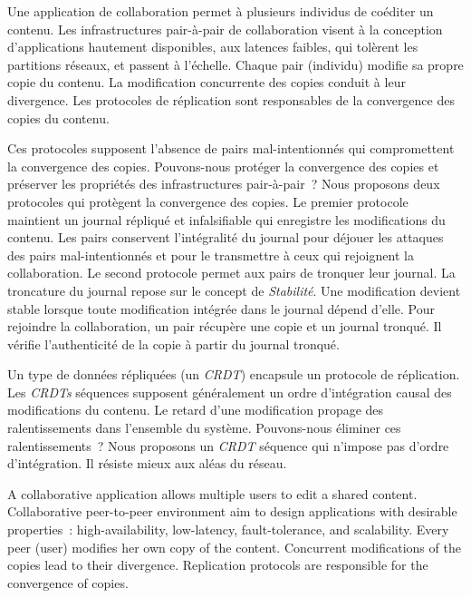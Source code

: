 \begin{ThesisAbstract}
\begin{FrenchAbstract}
Une application de collaboration permet à plusieurs individus de coéditer un contenu.
Les infrastructures pair-à-pair de collaboration visent à la conception d’applications hautement disponibles, aux latences faibles, qui tolèrent les partitions réseaux, et passent à l’échelle.
Chaque pair (individu) modifie sa propre copie du contenu.
La modification concurrente des copies conduit à leur divergence.
Les protocoles de réplication sont responsables de la convergence des copies du contenu.

Ces protocoles supposent l'absence de pairs mal-intentionnés qui compromettent la convergence des copies.
Pouvons-nous protéger la convergence des copies et préserver les propriétés des infrastructures pair-à-pair~?
Nous proposons deux protocoles qui protègent la convergence des copies.
Le premier protocole maintient un journal répliqué et infalsifiable qui enregistre les modifications du contenu.
Les pairs conservent l’intégralité du journal pour déjouer les attaques des pairs mal-intentionnés et pour le transmettre à ceux qui rejoignent la collaboration.
Le second protocole permet aux pairs de tronquer leur journal.
La troncature du journal repose sur le concept de \emph{Stabilité}.
Une modification devient stable lorsque toute modification intégrée dans le journal dépend d'elle.
Pour rejoindre la collaboration, un pair récupère une copie et un journal tronqué.
Il vérifie l'authenticité de la copie à partir du journal tronqué.

Un type de données répliquées (un \emph{CRDT}) encapsule un protocole de réplication.
Les \emph{CRDTs} séquences supposent généralement un ordre d'intégration causal des modifications du contenu.
Le retard d'une modification propage des ralentissements dans l'ensemble du système.
Pouvons-nous éliminer ces ralentissements~?
Nous proposons un \emph{CRDT} séquence qui n'impose pas d'ordre d'intégration.
Il résiste mieux aux aléas du réseau.

\end{FrenchAbstract}

\clearpage

\begin{EnglishAbstract}
A collaborative application allows multiple users to edit a shared content.
Collaborative peer-to-peer environment aim to design applications with desirable properties~: high-availability, low-latency, fault-tolerance, and scalability.
Every peer (user) modifies her own copy of the content.
Concurrent modifications of the copies lead to their divergence.
Replication protocols are responsible for the convergence of copies.


\end{EnglishAbstract}
\end{ThesisAbstract}
